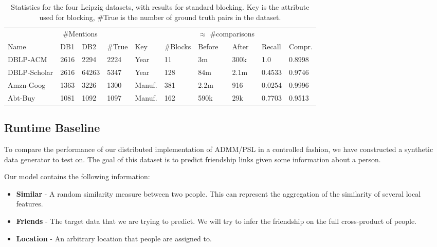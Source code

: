 \documentclass{article}
\begin{document}
\begin{table}
\centering
\begin{tabular}{*{10}{l}}  
\toprule
& \multicolumn{2}{c}{\#Mentions} & &   & &       \multicolumn{2}{c}{$\approx$ \#comparisons}    &  &    \\
\cmidrule(r){2-3} \cmidrule(r){7-8}
Name     & DB1  & DB2 &  \#True & Key & \#Blocks & Before  & After  & Recall & Compr. \\
\midrule
DBLP-ACM & 2616 & 2294 & 2224        & Year     & 11       & 3m & 300k & 1.0 & 0.8998 \\
DBLP-Scholar & 2616 & 64263 & 5347   & Year     & 128      & 84m & 2.1m & 0.4533 & 0.9746 \\
Amzn-Goog & 1363 & 3226 & 1300 & Manuf. & 381 & 2.2m & 916 & 0.0254 & 0.9996    \\
Abt-Buy & 1081 & 1092 & 1097   & Manuf. & 162 & 590k & 29k & 0.7703 & 0.9513 \\
\bottomrule
\end{tabular}
\caption{Statistics for the four Leipzig datasets, with results for standard blocking. Key is the attribute used for blocking, \#True is the number of ground truth pairs in the dataset.}
\label{table:stdblock-leipzig}
\end{table}

\subsection{Runtime Baseline}

To compare the performance of our distributed implementation of ADMM/PSL in a controlled fashion, we have constructed a synthetic data generator to test on.
The goal of this dataset is to predict friendship links given some information about a person.

Our model contains the following information:
\begin{itemize}
    \item \textbf{Similar} - A random similarity measure between two people. This can represent the aggregation of the similarity of several local features.
    \item \textbf{Friends} - The target data that we are trying to predict. We will try to infer the friendship on the full cross-product of people.
    \item \textbf{Location} - An arbitrary location that people are assigned to.
\end{itemize}
\end{document}
